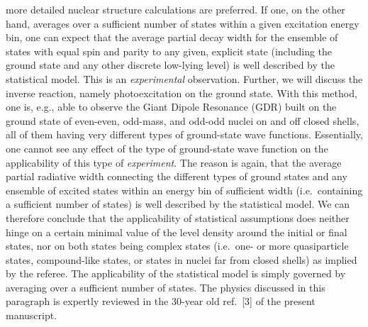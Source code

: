 \documentclass{article}
\begin{document}
more detailed nuclear structure calculations are preferred. If one, on the 
other hand, averages over a sufficient number of states within a given 
excitation energy bin, one can expect that the average partial decay width for 
the ensemble of states with equal spin and parity to any given, explicit state 
(including the ground state and any other discrete low-lying level) is well 
described by the statistical model. This is an {\em experimental} observation. 
Further, we will discuss the inverse reaction, namely photoexcitation on the 
ground state. With this method, one is, e.g., able to observe the Giant Dipole 
Resonance (GDR) built on the ground state of even-even, odd-mass, and odd-odd 
nuclei on and off closed shells, all of them having very different types of 
ground-state wave functions. Essentially, one cannot see any effect of the type
of ground-state wave function on the applicability of this type of 
{\em experiment}. The reason is again, that the average partial radiative width
connecting the different types of ground states and any ensemble of excited 
states within an energy bin of sufficient width (i.e.\ containing a sufficient 
number of states) is well described by the statistical model. We can therefore 
conclude that the applicability of statistical assumptions does neither hinge 
on a certain minimal value of the level density around the initial or final 
states, nor on both states being complex states (i.e.\ one- or more 
quasiparticle states, compound-like states, or states in nuclei far from closed
shells) as implied by the referee. The applicability of the statistical model 
is simply governed by averaging over a sufficient number of states. The physics
discussed in this paragraph is expertly reviewed in the 30-year old ref.\ [3] 
of the present manuscript.
\end{document}
